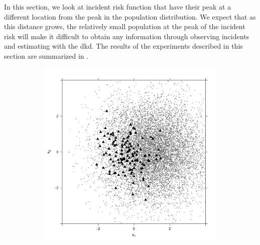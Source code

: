 In this section, we look at incident risk function that have their peak at a different location from the peak in the population distribution.
We expect that as this distance grows, the relatively small population at the peak of the incident risk will make it difficult to obtain any information through observing incidents and estimating with the \gls{dkd}.
The results of the experiments described in this section are summarized in .

\begin{figure}[htbp]
    \centering
    \begin{subfigure}{0.45\textwidth}
        \includegraphics[width=\textwidth]{results/p1.4_100_1_1h_2s/output/population_and_incidents_scatter}
        \label{fig:one_sample:p1.4_100_Gap_risk:2}
    \end{subfigure}
    \begin{subfigure}{0.45\textwidth}

\end{subfigure}
\end{figure}

